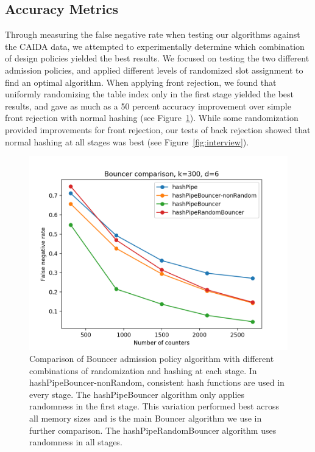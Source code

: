 \subsection{Accuracy Metrics}
Through measuring the false negative rate when testing our algorithms against the CAIDA data, we attempted to experimentally determine which combination of design policies yielded the best results. We focused on testing the two different admission policies, and applied different levels of randomized slot assignment to find an optimal algorithm. When applying front rejection, we found that uniformly randomizing the table index only in the first stage yielded the best results, and gave as much as a 50 percent accuracy improvement over simple front rejection with normal hashing (see Figure~\ref{fig:bouncer}). While some randomization provided improvements for front rejection, our tests of back rejection showed that normal hashing at all stages was best (see Figure~\ref{fig:interview}).
\begin{figure}[t]
  \centering
    \includegraphics[scale=0.5]{bouncer}
     \caption{Comparison of Bouncer admission policy algorithm with different combinations of randomization and hashing at each stage. In hashPipeBouncer-nonRandom, consistent hash functions are used in every stage. The hashPipeBouncer algorithm only applies randomness in the first stage. This variation performed best across all memory sizes and is the main Bouncer algorithm we use in further comparison. The hashPipeRandomBouncer algorithm uses randomness in all stages.}
     \label{fig:bouncer}
\end{figure}
